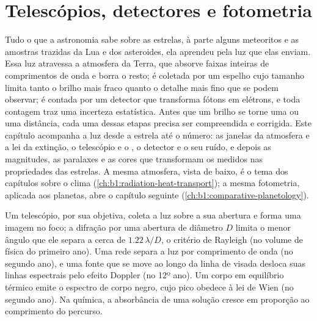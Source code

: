 \chapter{Telescópios, detectores e fotometria}\label{ch:b1:observing-the-sky}

Tudo o que a astronomia sabe sobre as estrelas, à parte alguns meteoritos e as amostras trazidas da Lua e dos asteroides, ela aprendeu pela luz que elas enviam. Essa luz atravessa a atmosfera da Terra, que absorve faixas inteiras de comprimentos de onda e borra o resto; é coletada por um espelho cujo tamanho limita tanto o brilho mais fraco quanto o detalhe mais fino que se podem observar; é contada por um detector que transforma fótons em elétrons, e toda contagem traz uma incerteza estatística. Antes que um brilho se torne uma  ou uma distância, cada uma dessas etapas precisa ser compreendida e corrigida. Este capítulo acompanha a luz desde a estrela até o número: as janelas da atmosfera e a lei da extinção, o telescópio e o , o detector e o seu ruído, e depois as magnitudes, as paralaxes e as cores que transformam os  medidos nas propriedades das estrelas. A mesma atmosfera, vista de baixo, é o tema dos capítulos sobre o clima (\cref{ch:b1:radiation-heat-transport}); a mesma fotometria, aplicada aos planetas, abre o capítulo seguinte (\cref{ch:b1:comparative-planetology}).

\begin{recall}
Um telescópio, por sua objetiva, coleta a luz sobre a sua abertura e forma uma imagem no foco; a difração por uma abertura de diâmetro $D$ limita o menor ângulo que ele separa a cerca de $1.22\,\lambda/D$, o critério de Rayleigh (no volume de física do primeiro ano). Uma rede separa a luz por comprimento de onda (no segundo ano), e uma fonte que se move ao longo da linha de visada desloca suas linhas espectrais pelo efeito Doppler (no 12º ano). Um corpo em equilíbrio térmico emite o espectro de corpo negro, cujo pico obedece à lei de Wien (no segundo ano). Na química, a absorbância de uma solução cresce em proporção ao comprimento do percurso.
\end{recall}

